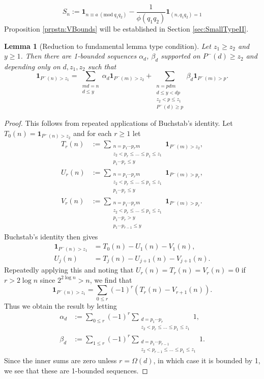 \documentclass[10pt]{amsart}
\theoremstyle{plain}
\newtheorem{lmm}[thrm]{Lemma}
\numberwithin{equation}{section}
\newcommand{\Mod}[1]{\ (\mathrm{mod}\ #1)}
\begin{document}
\[
S_n:=\mathbf{1}_{n\equiv a\Mod{q_1q_2}}-\frac{1}{\phi(q_1q_2)}\mathbf{1}_{(n,q_1q_2)=1}
\]
Proposition \ref{prpstn:VBounds} will be established in Section \ref{sec:SmallTypeII}.
%
%
%
%
%
%
%
%
\begin{lmm}[Reduction to fundamental lemma type condition]\label{lmm:Buchstab}
Let $z_1\ge z_2$ and $y\ge 1$. Then there are 1-bounded sequences $\alpha_d$, $\beta_{d}$ supported on $P^-(d)\ge z_2$ and depending only on $d,z_1,z_2$ such that
\[
\mathbf{1}_{P^-(n)>z_1}=\sum_{\substack{m d=n\\ d\le y}}\alpha_d\mathbf{1}_{P^-(m)> z_2}+\sum_{\substack{n=p d m\\ d\le y<d p\\ z_2<p\le z_1\\ P^-(d)\ge p}}\beta_{d}\mathbf{1}_{P^-(m)> p}.
\] 
\end{lmm}
%
%
%
%
\begin{proof}
This follows from repeated applications of Buchstab's identity. Let $T_0(n)=\mathbf{1}_{P^-(n)>z_2}$ and for each $r\ge 1$ let
\begin{align*}
T_r(n)&:=\sum_{\substack{n=p_1\cdots p_r m\\ z_2<p_r\le \ldots \le p_1\le z_1\\ p_1\cdots p_r\le y }}\mathbf{1}_{P^-(m)>z_2},\\
U_r(n)&:=\sum_{\substack{n=p_1\cdots p_r m\\ z_2<p_r\le \ldots \le p_1\le z_1\\ p_1\cdots p_r\le y }}\mathbf{1}_{P^-(m)>p_r},\\
V_r(n)&:=\sum_{\substack{n=p_1\cdots p_r m\\ z_2<p_r\le \ldots \le p_1\le z_1 \\ p_1\cdots p_r> y\\ p_1\cdots p_{r-1}\le y }}\mathbf{1}_{P^-(m)>p_r}.
\end{align*}
Buchstab's identity then gives
\begin{align*}
\mathbf{1}_{P^-(n)>z_1}&=T_0(n)-U_1(n)-V_1(n),\\
U_j(n)&=T_j(n)-U_{j+1}(n)-V_{j+1}(n).
\end{align*}
Repeatedly applying this and noting that $U_r(n)=T_r(n)=V_r(n)=0$ if $r>2\log{n}$ since $2^{2\log{n}}> n$, we find that
\[
\mathbf{1}_{P^-(n)>z_1}=\sum_{0\le r}(-1)^r (T_r(n)-V_{r+1}(n)).
\]
Thus we obtain the result by letting
\begin{align*}
\alpha_d&:=\sum_{0\le r}(-1)^r\sum_{\substack{d=p_1\cdots p_r \\ z_2<p_r\le \dots \le p_1\le z_1}}1,\\
\beta_d&:=\sum_{1\le r}(-1)^{r}\sum_{\substack{d=p_1\cdots p_{r-1}\\ z_2<p_{r-1}\le \dots \le p_1\le z_1 }}1.
\end{align*}
Since the inner sums are zero unless $r=\Omega(d)$, in which case it is bounded by 1, we see that these are 1-bounded sequences.
\end{proof}
\end{document}

